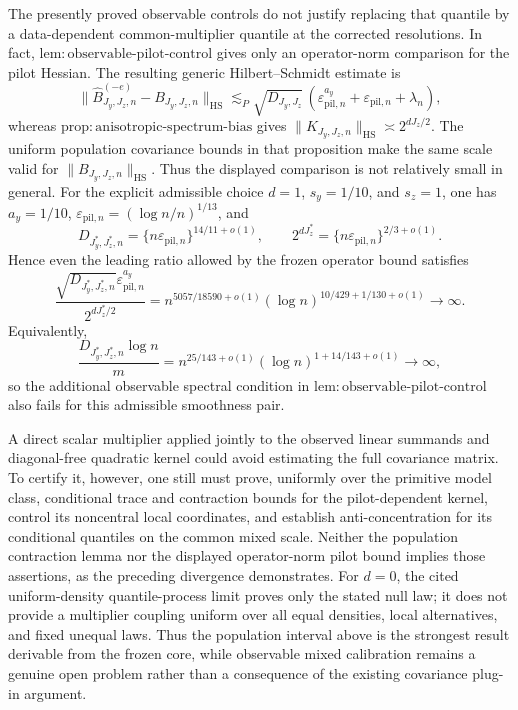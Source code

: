The presently proved observable controls do not justify replacing that
quantile by a data-dependent common-multiplier quantile at the corrected
resolutions.  In fact,
\(\mathrm{lem{:}observable\text{-}pilot\text{-}control}\) gives only an
operator-norm comparison for the pilot Hessian.  The resulting generic
Hilbert--Schmidt estimate is
\[
\|\widehat B_{J_y,J_z,n}^{(-e)}-B_{J_y,J_z,n}\|_{\mathrm{HS}}
\lesssim_P
\sqrt{D_{J_y,J_z}}\,
(\varepsilon_{\mathrm{pil},n}^{a_y}
+\varepsilon_{\mathrm{pil},n}+\lambda_n),
\]
whereas
\(\mathrm{prop{:}anisotropic\text{-}spectrum\text{-}bias}\) gives
\(\|K_{J_y,J_z,n}\|_{\mathrm{HS}}\asymp2^{dJ_z/2}\).  The uniform
population covariance bounds in that proposition make the same scale valid
for \(\|B_{J_y,J_z,n}\|_{\mathrm{HS}}\).  Thus the displayed comparison is
not relatively small in general.  For the explicit admissible choice
\(d=1\), \(s_y=1/10\), and \(s_z=1\), one has
\(a_y=1/10\),
\(\varepsilon_{\mathrm{pil},n}=(\log n/n)^{1/13}\), and
\[
D_{J_y^*,J_z^*,n}
=\{n\varepsilon_{\mathrm{pil},n}\}^{14/11+o(1)},
\qquad
2^{dJ_z^*}
=\{n\varepsilon_{\mathrm{pil},n}\}^{2/3+o(1)}.
\]
Hence even the leading ratio allowed by the frozen operator bound satisfies
\[
\frac{\sqrt{D_{J_y^*,J_z^*,n}}
\varepsilon_{\mathrm{pil},n}^{a_y}}
{2^{dJ_z^*/2}}
=n^{5057/18590+o(1)}
(\log n)^{10/429+1/130+o(1)}\longrightarrow\infty.
\]
Equivalently,
\[
\frac{D_{J_y^*,J_z^*,n}\log n}{m}
=n^{25/143+o(1)}
(\log n)^{1+14/143+o(1)}\longrightarrow\infty,
\]
so the additional observable spectral condition in
\(\mathrm{lem{:}observable\text{-}pilot\text{-}control}\) also fails for
this admissible smoothness pair.

A direct scalar multiplier applied jointly to the observed linear summands and
diagonal-free quadratic kernel could avoid estimating the full covariance
matrix.  To certify it, however, one still must prove, uniformly over the
primitive model class, conditional trace and contraction bounds for the
pilot-dependent kernel, control its noncentral local coordinates, and establish
anti-concentration for its conditional quantiles on the common mixed scale.
Neither the population contraction lemma nor the displayed operator-norm pilot
bound implies those assertions, as the preceding divergence demonstrates.
For \(d=0\), the cited uniform-density quantile-process limit proves only the
stated null law; it does not provide a multiplier coupling uniform over all
equal densities, local alternatives, and fixed unequal laws.  Thus the
population interval above is the strongest result derivable from the frozen
core, while observable mixed calibration remains a genuine open problem rather
than a consequence of the existing covariance plug-in argument.